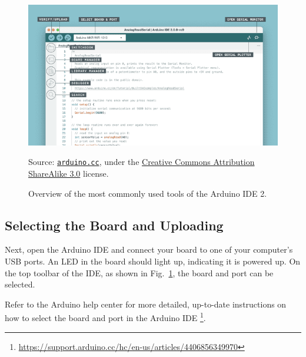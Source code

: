 \begin{figure}[b]
  \begin{wide}
    \centering
    \includegraphics[width=\textwidth]{img/ide-2-overview}%
    \\ \scriptsize
    \raggedright
    Source: \href{https://docs.arduino.cc/software/ide-v2/tutorials/getting-started-ide-v2/}{\texttt{arduino.cc}}, under the \href{https://creativecommons.org/licenses/by-sa/3.0/legalcode}{Creative Commons Attribution ShareAlike 3.0} license.
  \caption{Overview of the most commonly used tools of the Arduino IDE 2.
  }
  \label{fig:ide-2-overview}
  \end{wide}
\end{figure}

\subsection{Selecting the Board and Uploading}
Next, open the Arduino IDE and connect your board to one of your computer's USB ports.
An LED in the board should light up, indicating it is powered up.
On the top toolbar of the IDE, as shown in Fig.~\ref{fig:ide-2-overview}, the board and port can be selected.

Refer to the Arduino help center for more detailed, up-to-date instructions on how to select the board and port in the Arduino IDE%
\footnote{\url{https://support.arduino.cc/hc/en-us/articles/4406856349970}}.

